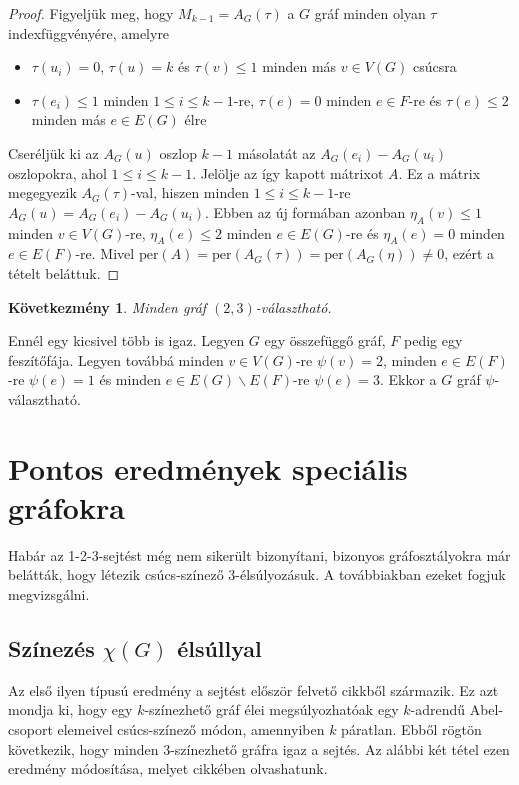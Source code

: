 \documentclass[12pt, a4paper]{report}
\newtheorem{köv}[tét]{Következmény}
\theoremstyle{remark}
\theoremstyle{definition}
\begin{document}
\begin{proof}
Figyeljük meg, hogy $M_{k - 1} = A_G(\tau)$ a $G$ gráf minden olyan $\tau$ indexfüggvényére, amelyre
\begin{itemize}
\item $\tau(u_i) = 0$, $\tau(u) = k$ és $\tau(v) \leq 1$ minden más $v \in V(G)$ csúcsra
\item $\tau(e_i) \leq 1$ minden $1 \leq i \leq k - 1$-re, $\tau(e) = 0$ minden $e \in F$-re és $\tau(e) \leq 2$ minden más $e \in E(G)$ élre
\end{itemize}

Cseréljük ki az $A_G(u)$ oszlop $k - 1$ másolatát az $A_G(e_i) - A_G(u_i)$ oszlopokra, ahol $1 \leq i \leq k - 1$. Jelölje az így kapott mátrixot $A$. Ez a mátrix megegyezik $A_G(\tau)$-val, hiszen minden $1 \leq i \leq k - 1$-re $A_G(u) = A_G(e_i) - A_G(u_i)$. Ebben az új formában azonban $\eta_A(v) \leq 1$ minden $v \in V(G)$-re, $\eta_A(e) \leq 2$ minden $e \in E(G)$-re és $\eta_A(e) = 0$ minden $e \in E(F)$-re. Mivel $\mathrm{per}(A) = \mathrm{per}(A_G(\tau)) = \mathrm{per}(A_G(\eta)) \neq 0$, ezért a tételt beláttuk.
\end{proof}

\begin{köv}
Minden gráf $(2, 3)$-választható.
\end{köv}

Ennél egy kicsivel több is igaz. Legyen $G$ egy összefüggő gráf, $F$ pedig egy feszítőfája. Legyen továbbá minden $v \in V(G)$-re $\psi(v) = 2$, minden $e \in E(F)$-re $\psi(e) = 1$ és minden $e \in E(G) \smallsetminus E(F)$-re $\psi(e) = 3$. Ekkor a $G$ gráf $\psi$-választható. 

\chapter{Pontos eredmények speciális gráfokra}
Habár az 1-2-3-sejtést még nem sikerült bizonyítani, bizonyos gráfosztályokra már belátták, hogy létezik csúcs-színező $3$-élsúlyozásuk. A továbbiakban ezeket fogjuk megvizsgálni.

\section{Színezés $χ(G)$ élsúllyal}
Az első ilyen típusú eredmény a sejtést először felvető cikkből \cite{Karonski2004} származik. Ez azt mondja ki, hogy egy $k$-színezhető gráf élei megsúlyozhatóak egy $k$-adrendű Abel-csoport elemeivel csúcs-színező módon, amennyiben $k$ páratlan. Ebből rögtön következik, hogy minden $3$-színezhető gráfra igaz a sejtés. Az alábbi két tétel ezen eredmény módosítása, melyet \citeauthor{Lu2011} \cite{Lu2011} cikkében olvashatunk.
\end{document}

